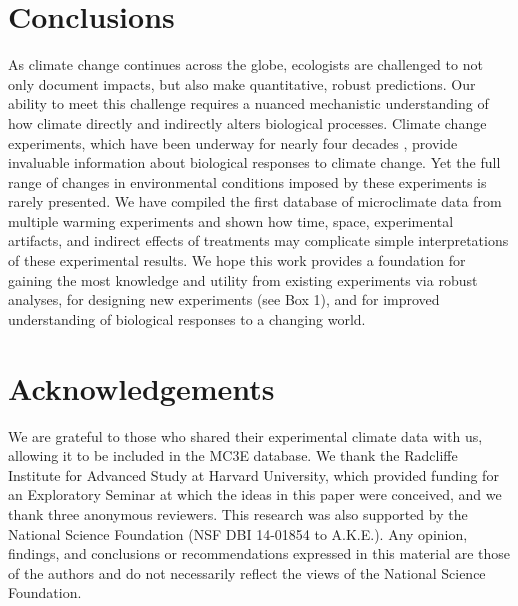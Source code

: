 \documentclass{article}
\begin{document}
\section* {Conclusions}
\par As climate change continues across the globe, ecologists are challenged to not only document impacts, but also make quantitative, robust predictions. Our ability to meet this challenge requires a nuanced mechanistic understanding of how climate directly and indirectly alters biological processes. Climate change experiments, which have been underway for nearly four decades \citep[e.g.,][]{tamaki1981,carlson1982,melillo2017}, provide invaluable information about biological responses to climate change. Yet the full range of changes in environmental conditions imposed by these experiments is rarely presented. We have compiled the first database of microclimate data from multiple warming experiments and shown how time, space, experimental artifacts, and indirect effects of treatments may complicate simple interpretations of these experimental results. We hope this work provides a foundation for gaining the most knowledge and utility from existing experiments via robust analyses, for designing new experiments (see Box 1), and for improved understanding of biological responses to a changing world.

 \section* {Acknowledgements}
We are grateful to those who shared their experimental climate data with us, allowing it to be included in the MC3E database. We thank the Radcliffe Institute for Advanced Study at Harvard University, which provided funding for an Exploratory Seminar at which the ideas in this paper were conceived, and we thank three anonymous reviewers. This research was also supported by the National Science Foundation (NSF DBI 14-01854 to A.K.E.). Any opinion, findings, and conclusions or recommendations expressed in this material are those of the authors and do not necessarily reflect the views of the National Science Foundation.
\end{document}
